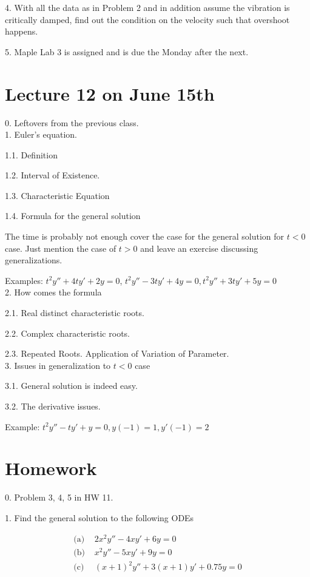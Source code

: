 \documentclass[11pt]{article}
\begin{document}
4. With all the data as in Problem 2 and in addition assume the vibration is critically damped, find out the condition on the velocity such that overshoot happens. 

5. Maple Lab 3 is assigned and is due the Monday after the next. 

\newpage

\section{Lecture 12 on June 15th}

0. Leftovers from the previous class. \\

1. Euler's equation.

1.1. Definition

1.2. Interval of Existence. 

1.3. Characteristic Equation 

1.4. Formula for the general solution

The time is probably not enough cover the case for the general solution for $t<0$ case. Just mention the case of $t>0$ and leave an exercise discussing generalizations. 

Examples: $t^2y'' + 4t y' + 2y = 0$, $t^2 y'' - 3t y' + 4y=0, t^2 y'' + 3t y' + 5y = 0$\\

2. How comes the formula

2.1. Real distinct characteristic roots.

2.2. Complex characteristic roots.

2.3. Repeated Roots. Application of Variation of Parameter.\\

3. Issues in generalization to $t<0$ case

3.1. General solution is indeed easy. 

3.2. The derivative issues.

Example: $t^2y'' - ty' +y = 0, y(-1)=1, y'(-1)=2$

\newpage

\section*{Homework}

0. Problem 3, 4, 5 in HW 11. 

1. Find the general solution to the following ODEs

$$\begin{aligned}
\text{(a)  }&2x^2 y'' - 4x y' + 6y = 0\\
\text{(b)  }&x^2 y'' - 5xy' + 9y = 0\\
\text{(c)  }&(x+1)^2 y'' + 3(x+1)y' + 0.75y = 0\\
\end{aligned}$$
\end{document}
